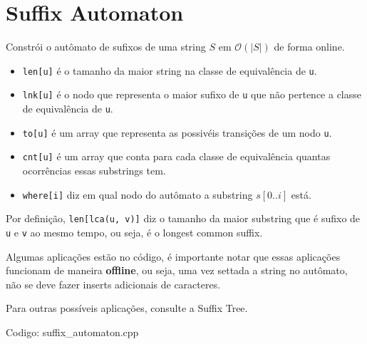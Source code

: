\documentclass[10pt, a4paper, oneside]{book}
\begin{document}
\section{Suffix Automaton}


Constrói o autômato de sufixos de uma string $S$ em $\mathcal{O}(|S|)$ de forma online.  



\begin{itemize}
\item \texttt{len[u]} é o tamanho da maior string na classe de equivalência de \texttt{u}.
\item \texttt{lnk[u]} é o nodo que representa o maior sufixo de \texttt{u} que não pertence a classe de equivalência de \texttt{u}.
\item \texttt{to[u]} é um array que representa as possivéis transições de um nodo \texttt{u}.
\item \texttt{cnt[u]} é um array que conta para cada classe de equivalência quantas ocorrências essas substrings tem.
\item \texttt{where[i]} diz em qual nodo do autômato a substring $s[0..i]$ está.
\end{itemize}



Por definição, \texttt{len[lca(u, v)]} diz o tamanho da maior substring que é sufixo de \texttt{u} e \texttt{v} ao mesmo tempo, ou seja, é o longest common suffix.



Algumas aplicações estão no código, é importante notar que essas aplicações funcionam de maneira \textbf{offline}, ou seja, uma vez settada a string no autômato, não se deve fazer inserts adicionais de caracteres.



Para outras possíveis aplicações, consulte a Suffix Tree.
\hfill

Codigo: suffix\_automaton.cpp
\end{document}
